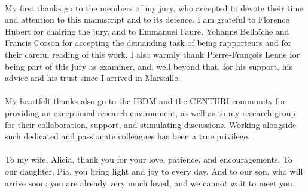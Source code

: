 \paragraph{}My first thanks go to the members of my jury, who accepted to devote their time and attention to this manuscript and to its defence.
I am grateful to Florence Hubert for chairing the jury, and to Emmanuel Faure, Yohanns Bellaïche and Francis Corson for accepting the demanding task of being rapporteurs and for their careful reading of this work.
I also warmly thank Pierre-François Lenne for being part of this jury as examiner, and, well beyond that, for his support, his advice and his trust since I arrived in Marseille.

\paragraph{}My heartfelt thanks also go to the IBDM and the CENTURI community for providing an exceptional research environment, as well as to my research group for their collaboration, support, and stimulating discussions.
Working alongside such dedicated and passionate colleagues has been a true privilege.

\paragraph{}To my wife, Alicia, thank you for your love, patience, and encouragements.
To our daughter, Pia, you bring light and joy to every day.
And to our son, who will arrive soon: you are already very much loved, and we cannot wait to meet you.

\paragraph{}
